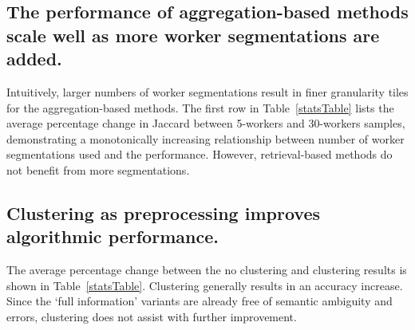 \subsection{The performance of aggregation-based methods scale well as more worker segmentations are added.}
\par \noindent Intuitively, larger numbers of worker segmentations result in finer granularity tiles for the aggregation-based methods. The first row in Table~\ref{statsTable} lists the average percentage change in Jaccard between 5-workers and 30-workers samples, demonstrating a monotonically increasing relationship between number of worker segmentations used and the performance. However, retrieval-based methods do not benefit from more segmentations.

\subsection{Clustering as preprocessing improves algorithmic performance.}
\par \noindent The average percentage change between the no clustering and clustering results is shown in Table~\ref{statsTable}. Clustering generally results in an accuracy increase. Since the `full information' variants are already free of semantic ambiguity and errors, clustering does not assist with further improvement. %
\begin{table}[h!]
     \small
      \caption{Jaccard percentage change due to worker scaling and clustering. Algorithms with * makes use of ground truth information.}
      \label{statsTable} 
\end{table}
